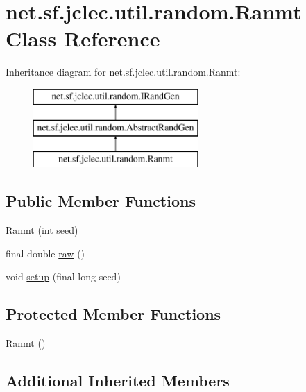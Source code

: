 \hypertarget{classnet_1_1sf_1_1jclec_1_1util_1_1random_1_1_ranmt}{\section{net.\-sf.\-jclec.\-util.\-random.\-Ranmt Class Reference}
\label{classnet_1_1sf_1_1jclec_1_1util_1_1random_1_1_ranmt}
}
Inheritance diagram for net.\-sf.\-jclec.\-util.\-random.\-Ranmt\-:\begin{figure}[H]
\begin{center}
\leavevmode
\includegraphics[height=3.000000cm]{classnet_1_1sf_1_1jclec_1_1util_1_1random_1_1_ranmt}
\end{center}
\end{figure}
\subsection*{Public Member Functions}
\begin{DoxyCompactItemize}
\item 
\hyperlink{classnet_1_1sf_1_1jclec_1_1util_1_1random_1_1_ranmt_a6670b76a16e08ca10517aa5e9f279d78}{Ranmt} (int seed)
\item 
final double \hyperlink{classnet_1_1sf_1_1jclec_1_1util_1_1random_1_1_ranmt_a1b7f2b9ee32ff12ec33d8d877109cbc2}{raw} ()
\item 
void \hyperlink{classnet_1_1sf_1_1jclec_1_1util_1_1random_1_1_ranmt_ac10177ee1ab9eec63ba41db8ad57fcdb}{setup} (final long seed)
\end{DoxyCompactItemize}
\subsection*{Protected Member Functions}
\begin{DoxyCompactItemize}
\item 
\hyperlink{classnet_1_1sf_1_1jclec_1_1util_1_1random_1_1_ranmt_a26af99db288b78b1040e613097469376}{Ranmt} ()
\end{DoxyCompactItemize}
\subsection*{Additional Inherited Members}



